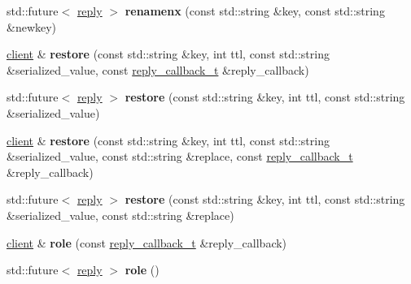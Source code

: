 \begin{DoxyCompactItemize}
std\+::future$<$ \hyperlink{classcpp__redis_1_1reply}{reply} $>$ {\bfseries renamenx} (const std\+::string \&key, const std\+::string \&newkey)
\item 
\mbox{\label{classcpp__redis_1_1client_a3598f781ae048b03edcdb07e8d2c0f41}} 
\hyperlink{classcpp__redis_1_1client}{client} \& {\bfseries restore} (const std\+::string \&key, int ttl, const std\+::string \&serialized\+\_\+value, const \hyperlink{classcpp__redis_1_1client_a061a1140d36d2eaeda82b09a0bb3f9f2}{reply\+\_\+callback\+\_\+t} \&reply\+\_\+callback)
\item 
\mbox{\label{classcpp__redis_1_1client_a5b7a7d7de93268198f27cd21f63ba337}} 
std\+::future$<$ \hyperlink{classcpp__redis_1_1reply}{reply} $>$ {\bfseries restore} (const std\+::string \&key, int ttl, const std\+::string \&serialized\+\_\+value)
\item 
\mbox{\label{classcpp__redis_1_1client_a5ebff3760403ee7d031083f185792780}} 
\hyperlink{classcpp__redis_1_1client}{client} \& {\bfseries restore} (const std\+::string \&key, int ttl, const std\+::string \&serialized\+\_\+value, const std\+::string \&replace, const \hyperlink{classcpp__redis_1_1client_a061a1140d36d2eaeda82b09a0bb3f9f2}{reply\+\_\+callback\+\_\+t} \&reply\+\_\+callback)
\item 
\mbox{\label{classcpp__redis_1_1client_a15b2c81c1d5b86f3490ecfb154b29ad1}} 
std\+::future$<$ \hyperlink{classcpp__redis_1_1reply}{reply} $>$ {\bfseries restore} (const std\+::string \&key, int ttl, const std\+::string \&serialized\+\_\+value, const std\+::string \&replace)
\item 
\mbox{\label{classcpp__redis_1_1client_a73bc7e0a747d437e5f9ac233a152c9bc}} 
\hyperlink{classcpp__redis_1_1client}{client} \& {\bfseries role} (const \hyperlink{classcpp__redis_1_1client_a061a1140d36d2eaeda82b09a0bb3f9f2}{reply\+\_\+callback\+\_\+t} \&reply\+\_\+callback)
\item 
\mbox{\label{classcpp__redis_1_1client_a34abe0819734b88704d89972b651e7ed}} 
std\+::future$<$ \hyperlink{classcpp__redis_1_1reply}{reply} $>$ {\bfseries role} ()
\item 

\end{DoxyCompactItemize}
